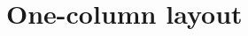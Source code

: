 \documentclass{article}
\begin{document}
\section*{One-column layout}
\lipsum[1]
\begin{figure}[h]\centering
  \caption{\texttt{\string\gnuplotfit[0.8\string\linewidth][10\string\baselineskip]}}
\end{figure}
\lipsum[2-3]
\end{document}
